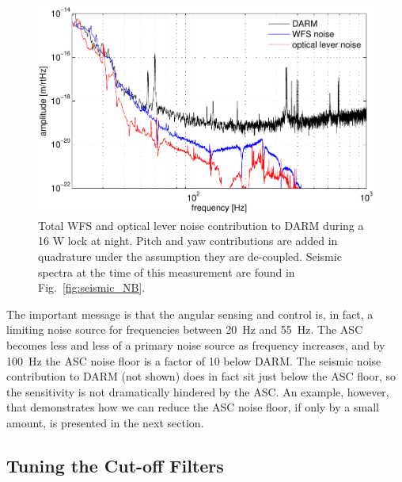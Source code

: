 \begin{figure}
\begin{centering}
\includegraphics[width=1.0\columnwidth]{figures/ASC2DARM.pdf}
\caption[Total WFS and optical lever noise contribution to DARM during
a 16 W lock at night]{Total WFS and optical lever noise contribution
  to DARM during a 16 W lock at night. Pitch and yaw contributions are
  added in quadrature under the assumption they are
  de-coupled. Seismic spectra at the time of this measurement are found
  in Fig.~\ref{fig:seismic_NB}.}
\label{fig:asc2darm}
\end{centering}
\end{figure}

The important message is that the angular sensing and control is, in
fact, a limiting noise source for frequencies between 20~Hz and
55~Hz. The ASC becomes less and less of a primary noise source as
frequency increases, and by 100~Hz the ASC noise floor is a factor of
10 below DARM. The seismic noise contribution to DARM (not shown) does
in fact sit just below the ASC floor, so the sensitivity is not
dramatically hindered by the ASC. An example, however, that
demonstrates how we can reduce the ASC noise floor, if only by a small
amount, is presented in the next section.



\subsection{Tuning the Cut-off Filters} 

